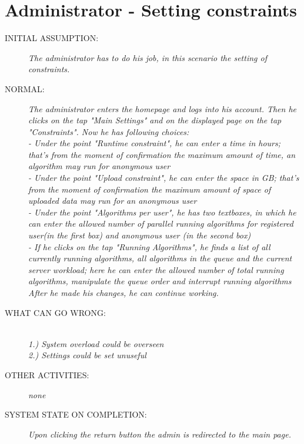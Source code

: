 \section{Administrator - Setting constraints}
\begin{description}
  \item [INITIAL ASSUMPTION:]
    \textit{The administrator has to do his job, in this scenario the setting of constraints.
}
  \item [NORMAL:]
    \textit{The administrator enters the homepage and logs into his account. Then he clicks on the tap "Main Settings" and on the displayed page on the tap "Constraints". Now he has following choices:
    \\- Under the point "Runtime constraint", he can enter a time in hours; that’s from the moment of confirmation the maximum amount of time, an algorithm may run for anonymous user
	\\- Under the point "Upload constraint", he can enter the space in GB; that’s from the moment of confirmation the maximum amount of space of uploaded data may run for an anonymous user
	\\- Under the point "Algorithms per user", he has two textboxes, in which he can enter the allowed number of parallel running algorithms for registered user(in the first box) and anonymous user (in the second box)
	\\- If he clicks on the tap "Running Algorithms", he finds a list of all currently running algorithms, all algorithms in the queue and the current server workload; here he can enter the allowed number of total running algorithms, manipulate the queue order and interrupt running algorithms
	\\After he made his changes, he can continue working.}
  \item [WHAT CAN GO WRONG:]
    \textit{\\1.) System overload could be overseen
			\\2.) Settings could be set unuseful
}
  \item [OTHER ACTIVITIES:]
    \textit{none}
  \item [SYSTEM STATE ON COMPLETION:]
    \textit{Upon clicking the return button the admin is redirected to the main page.}
\end{description}